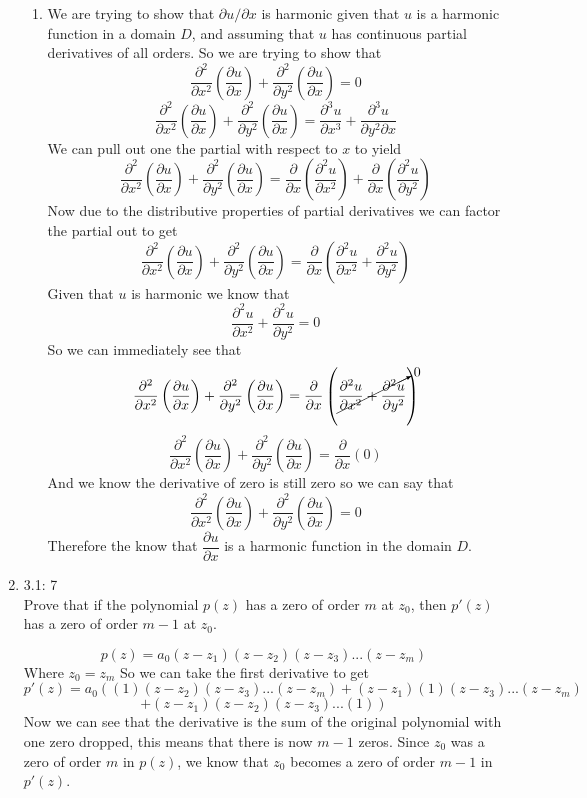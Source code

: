 \documentclass[11pt]{article}
\begin{document}
\begin{enumerate}
\begin{enumerate}
\item We are trying to show that $\partial u/\partial x$ is harmonic given that $u$ is a harmonic function in a domain $D$, and assuming that $u$ has continuous partial derivatives of all orders. So we are trying to show that 
$$\frac{\partial^2 }{\partial x^2}\left(\frac{\partial u}{\partial x}\right) +\frac{\partial^2 }{\partial y^2}\left(\frac{\partial u}{\partial x}\right) =0$$
$$\frac{\partial^2 }{\partial x^2}\left(\frac{\partial u}{\partial x}\right) +\frac{\partial^2 }{\partial y^2}\left(\frac{\partial u}{\partial x}\right) =\frac{\partial^3 u}{\partial x^3} +\frac{\partial^3u}{\partial y^2\partial x}$$
We can pull out one the partial with respect to $x$ to yield
$$\frac{\partial^2 }{\partial x^2}\left(\frac{\partial u}{\partial x}\right) +\frac{\partial^2 }{\partial y^2}\left(\frac{\partial u}{\partial x}\right) =\frac{\partial }{\partial x}\left(\frac{\partial^2 u}{\partial x^2}\right) +\frac{\partial}{\partial x}\left(\frac{\partial^2 u}{\partial y^2}\right)$$
Now due to the distributive properties of partial derivatives we can factor the partial out to get
$$\frac{\partial^2 }{\partial x^2}\left(\frac{\partial u}{\partial x}\right) +\frac{\partial^2 }{\partial y^2}\left(\frac{\partial u}{\partial x}\right) =\frac{\partial }{\partial x}\left(\frac{\partial^2 u}{\partial x^2} +\frac{\partial^2 u}{\partial y^2}\right)$$
Given that $u$ is harmonic we know that 
$$\frac{\partial^2 u}{\partial x^2} +\frac{\partial^2 u}{\partial y^2} =0$$
So we can immediately see that 
$$\frac{\partial^2 }{\partial x^2}\left(\frac{\partial u}{\partial x}\right) +\frac{\partial^2 }{\partial y^2}\left(\frac{\partial u}{\partial x}\right) =\frac{\partial }{\partial x}\left(\cancelto{0}{\frac{\partial^2 u}{\partial x^2} +\frac{\partial^2 u}{\partial y^2}}\right)$$
$$\frac{\partial^2 }{\partial x^2}\left(\frac{\partial u}{\partial x}\right) +\frac{\partial^2 }{\partial y^2}\left(\frac{\partial u}{\partial x}\right) =\frac{\partial }{\partial x}\left(0\right)$$
And we know the derivative of zero is still zero so we can say that
$$\frac{\partial^2 }{\partial x^2}\left(\frac{\partial u}{\partial x}\right) +\frac{\partial^2 }{\partial y^2}\left(\frac{\partial u}{\partial x}\right) =0$$
Therefore the know that $\dfrac{\partial u}{\partial x}$ is a harmonic function in the domain $D$.

\end{enumerate}

\item 3.1: 7 \\
Prove that if the polynomial $p(z)$ has a zero of order $m$ at $z_0$, then $p'(z)$ has a zero of order $m-1$ at $z_0$.

$$p(z) = a_0(z-z_1)(z-z_2)(z-z_3)...(z-z_m)$$
Where $z_0 = z_m$
So we can take the first derivative to get
$$p'(z) = a_0\left((1)(z-z_2)(z-z_3)...(z-z_m)+(z-z_1)(1)(z-z_3)...(z-z_m)\right.$$
$$\left.+(z-z_1)(z-z_2)(z-z_3)...(1)\right)$$
Now we can see that the derivative is the sum of the original polynomial with one zero dropped, this means that there is now $m-1$ zeros. Since $z_0$ was a zero of order $m$ in $p(z)$, we know that $z_0$ becomes a zero of order $m-1$ in $p'(z)$.
\end{enumerate}
\end{document}
